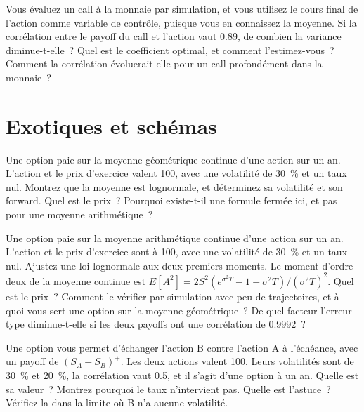 \begin{question}\label{iq:iv2:pricing-and-numerics:32}
Vous évaluez un call à la monnaie par simulation, et vous utilisez le cours final de l'action comme variable de contrôle, puisque vous en connaissez la moyenne. Si la corrélation entre le payoff du call et l'action vaut 0.89, de combien la variance diminue-t-elle~? Quel est le coefficient optimal, et comment l'estimez-vous~? Comment la corrélation évoluerait-elle pour un call profondément dans la monnaie~?
\end{question}

\section{Exotiques et schémas}

\begin{question}\label{iq:iv2:pricing-and-numerics:33}
Une option paie sur la moyenne géométrique continue d'une action sur un an. L'action et le prix d'exercice valent 100, avec une volatilité de 30~\% et un taux nul. Montrez que la moyenne est lognormale, et déterminez sa volatilité et son forward. Quel est le prix~? Pourquoi existe-t-il une formule fermée ici, et pas pour une moyenne arithmétique~?
\end{question}

\begin{question}\label{iq:iv2:pricing-and-numerics:34}
Une option paie sur la moyenne arithmétique continue d'une action sur un an. L'action et le prix d'exercice sont à 100, avec une volatilité de 30~\% et un taux nul. Ajustez une loi lognormale aux deux premiers moments. Le moment d'ordre deux de la moyenne continue est $E[A^2] = 2S^2(e^{\sigma^2T} - 1 - \sigma^2T)/(\sigma^2T)^2$. Quel est le prix~? Comment le vérifier par simulation avec peu de trajectoires, et à quoi vous sert une option sur la moyenne géométrique~? De quel facteur l'erreur type diminue-t-elle si les deux payoffs ont une corrélation de 0.9992~?
\end{question}

\begin{question}\label{iq:iv2:pricing-and-numerics:35}
Une option vous permet d'échanger l'action B contre l'action A à l'échéance, avec un payoff de $(S_A - S_B)^+$. Les deux actions valent 100. Leurs volatilités sont de 30~\% et 20~\%, la corrélation vaut 0.5, et il s'agit d'une option à un an. Quelle est sa valeur~? Montrez pourquoi le taux n'intervient pas. Quelle est l'astuce~? Vérifiez-la dans la limite où B n'a aucune volatilité.
\end{question}

